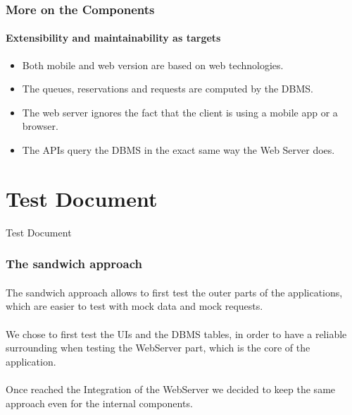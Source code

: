 \documentclass[10pt,xcolor={usenames,dvipsnames}]{beamer}
\begin{document}
\begin{frame}
	\frametitle{More on the Components}
	\framesubtitle{Extensibility and maintainability as targets}
	\begin{itemize}
		\item Both mobile and web version are based on web technologies.
		\item The queues, reservations and requests are computed by the DBMS.
		\item The web server ignores the fact that the client is using a mobile app or a browser.
		\item The APIs query the DBMS in the exact same way the Web Server does.
	\end{itemize}
\end{frame}

\section[Section]{Test Document}
\begin{frame}
	\begin{center}
		Test Document	
	\end{center}
\end{frame}
\begin{frame}
	\frametitle{The sandwich approach}
	\framesubtitle{}
	The sandwich approach allows to first test the outer parts of the applications, which are easier to test with mock data and mock requests.\\
	\-\\
	We chose to first test the UIs and the DBMS tables, in order to have a reliable surrounding when testing the WebServer part, which is the core of the application.\\
	\-\\
	Once reached the Integration of the WebServer we decided to keep the same approach even for the internal components.
\end{frame}
\end{document}
